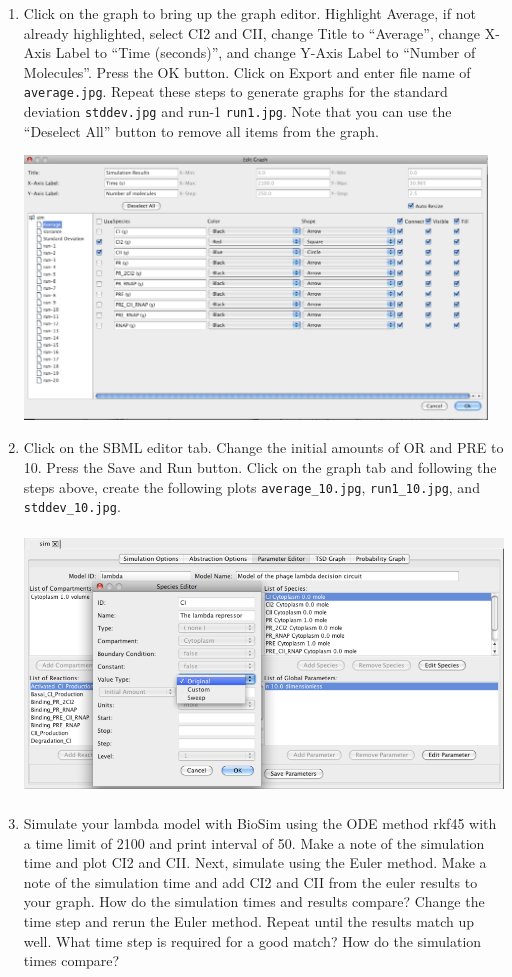 \documentclass[titlepage,11pt]{article}
\begin{document}
\begin{enumerate}
\item Click on the graph to bring up the graph editor.  Highlight Average,
      if not already highlighted, select CI2 and CII, change Title to
      ``Average'', change X-Axis Label to ``Time (seconds)'', and change
      Y-Axis Label to ``Number of Molecules''.  Press the OK button.
      Click on Export and enter file name of {\tt average.jpg}.
      Repeat these steps to generate graphs for the standard deviation
      {\tt stddev.jpg} and run-1 {\tt run1.jpg}.  
      Note that you can use the ``Deselect All'' button to
      remove all items from the graph.

\includegraphics[height=70mm]{screenshots/editGraph}

\item Click on the SBML editor tab.  Change the initial amounts of OR and
      PRE to 10.  Press the Save and Run button.
      Click on the graph tab and following the steps above, create the 
      following plots {\tt average\_10.jpg},  {\tt run1\_10.jpg}, and
      {\tt stddev\_10.jpg}.  

\includegraphics[height=70mm]{screenshots/paramEdit}

\item Simulate your lambda model with BioSim using the ODE method rkf45 with
      a time limit of 2100 and print interval of 50.
      Make a note of the simulation time and plot CI2 and CII.  
      Next, simulate using the Euler method.  Make a note of the simulation time
      and add CI2 and CII from the euler results to your graph.  
      How do the simulation times and results compare?
      Change the time step and rerun the Euler method.  Repeat until the results
      match up well.  What time step is required for a good match?
      How do the simulation times compare?
\end{enumerate}
\end{document}

